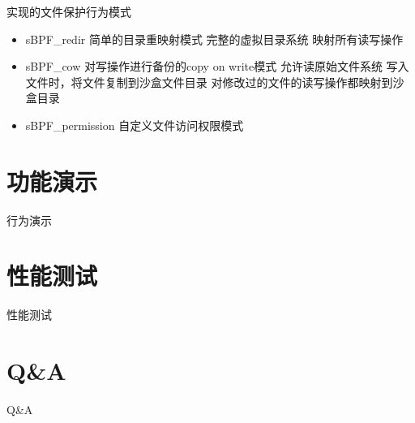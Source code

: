 \documentclass[UTF8,fontset=macnew,xcolor=table]{ctexbeamer}
\begin{document}
\begin{frame}{实现的文件保护行为模式}

    \begin{itemize}
        \item {\ttfamily sBPF\_redir} 简单的目录重映射模式 
        完整的虚拟目录系统
        映射所有读写操作
        
        \item {\ttfamily sBPF\_cow} 对写操作进行备份的copy on write模式
        允许读原始文件系统
        写入文件时，将文件复制到沙盒文件目录
        对修改过的文件的读写操作都映射到沙盒目录
        
        \item {\ttfamily sBPF\_permission} 自定义文件访问权限模式
    \end{itemize}
    
\end{frame}

\section{功能演示}
\begin{frame}{行为演示}

\end{frame}

\section{性能测试}
\begin{frame}{性能测试}
    
\end{frame}

\section{Q\&A}
\begin{frame}{Q\&A}
    
\end{frame}
\end{document}
